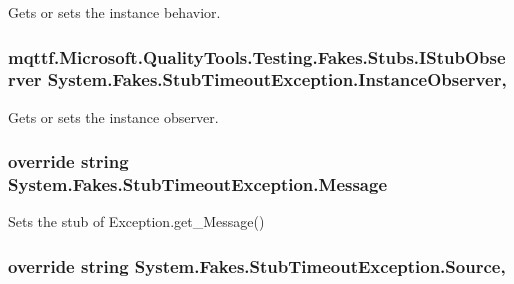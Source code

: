Gets or sets the instance behavior.

\hypertarget{class_system_1_1_fakes_1_1_stub_timeout_exception_ada467c5afdc388397f6138feabeccdb6}{
\subsubsection[{Instance\-Observer}]{\setlength{\rightskip}{0pt plus 5cm}mqttf.\-Microsoft.\-Quality\-Tools.\-Testing.\-Fakes.\-Stubs.\-I\-Stub\-Observer System.\-Fakes.\-Stub\-Timeout\-Exception.\-Instance\-Observer\hspace{0.3cm}{\ttfamily [get]}, {\ttfamily [set]}}}\label{class_system_1_1_fakes_1_1_stub_timeout_exception_ada467c5afdc388397f6138feabeccdb6}


Gets or sets the instance observer.

\hypertarget{class_system_1_1_fakes_1_1_stub_timeout_exception_ab2da5f479fe0f9a38ee3527046dafd9f}{
\subsubsection[{Message}]{\setlength{\rightskip}{0pt plus 5cm}override string System.\-Fakes.\-Stub\-Timeout\-Exception.\-Message\hspace{0.3cm}{\ttfamily [get]}}}\label{class_system_1_1_fakes_1_1_stub_timeout_exception_ab2da5f479fe0f9a38ee3527046dafd9f}


Sets the stub of Exception.\-get\-\_\-\-Message()

\hypertarget{class_system_1_1_fakes_1_1_stub_timeout_exception_a8b9095d52ea9db1395ad61cceadda02e}{
\subsubsection[{Source}]{\setlength{\rightskip}{0pt plus 5cm}override string System.\-Fakes.\-Stub\-Timeout\-Exception.\-Source\hspace{0.3cm}{\ttfamily [get]}, {\ttfamily [set]}}}\label{class_system_1_1_fakes_1_1_stub_timeout_exception_a8b9095d52ea9db1395ad61cceadda02e}


